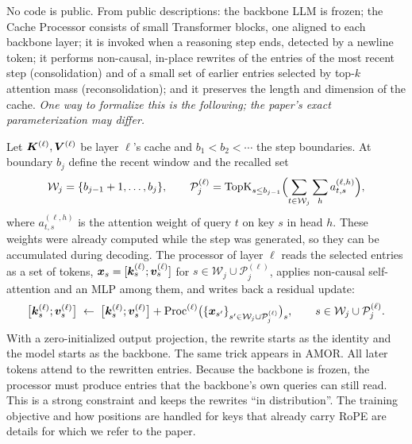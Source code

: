 No code is public. From public descriptions: the backbone LLM is frozen; the Cache Processor consists of
small Transformer blocks, one aligned to each backbone layer; it is invoked when a reasoning step ends,
detected by a newline token; it performs non-causal, in-place rewrites of the entries of the most recent
step (consolidation) and of a small set of earlier entries selected by top-$k$ attention mass
(reconsolidation); and it preserves the length and dimension of the cache. \emph{One way to formalize
this is the following; the paper's exact parameterization may differ.}

Let $\bm{K}^{(\ell)},\bm{V}^{(\ell)}$ be layer $\ell$'s cache and $b_1<b_2<\cdots$ the step boundaries. At
boundary $b_j$ define the recent window and the recalled set
\begin{equation}\label{eq:c13-bt-sets}
  \mathcal{W}_j=\{b_{j-1}+1,\dots,b_j\},\qquad
  \mathcal{P}^{(\ell)}_j=\operatorname{TopK}_{s\le b_{j-1}}\Bigl(\sum_{t\in\mathcal{W}_j}\sum_{h}a^{(\ell,h)}_{t,s}\Bigr),
\end{equation}
where $a^{(\ell,h)}_{t,s}$ is the attention weight of query $t$ on key $s$ in head $h$. These weights
were already computed while the step was generated, so they can be accumulated during decoding. The
processor of layer $\ell$ reads the selected entries as a set of tokens, $\bm{x}_s=[\bm{k}^{(\ell)}_s;\bm{v}^{(\ell)}_s]$
for $s\in\mathcal{W}_j\cup\mathcal{P}^{(\ell)}_j$, applies non-causal self-attention and an MLP among
them, and writes back a residual update:
\begin{equation}\label{eq:c13-bt-rewrite}
  \bigl[\bm{k}^{(\ell)}_s;\bm{v}^{(\ell)}_s\bigr]\;\leftarrow\;\bigl[\bm{k}^{(\ell)}_s;\bm{v}^{(\ell)}_s\bigr]
  + \mathrm{Proc}^{(\ell)}\bigl(\{\bm{x}_{s'}\}_{s'\in\mathcal{W}_j\cup\mathcal{P}^{(\ell)}_j}\bigr)_s,
  \qquad s\in\mathcal{W}_j\cup\mathcal{P}^{(\ell)}_j .
\end{equation}
With a zero-initialized output projection, the rewrite starts as the identity and the model starts as
the backbone. The same trick appears in AMOR. All later tokens attend to the rewritten entries. Because
the backbone is frozen, the processor must produce entries that the backbone's own queries can still
read. This is a strong constraint and keeps the rewrites ``in distribution''. The training objective and
how positions are handled for keys that already carry RoPE are details for which we refer to the paper.


